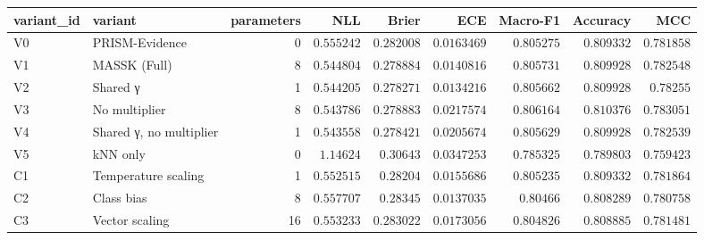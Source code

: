 \begin{tabular}{llrrrrrrr}
\toprule
variant\_id & variant & parameters & NLL & Brier & ECE & Macro-F1 & Accuracy & MCC \\
\midrule
V0 & PRISM-Evidence & 0 & $0.555242$ & $0.282008$ & $0.0163469$ & $0.805275$ & $0.809332$ & $0.781858$ \\
V1 & MASSK (Full) & 8 & $0.544804$ & $0.278884$ & $0.0140816$ & $0.805731$ & $0.809928$ & $0.782548$ \\
V2 & Shared γ & 1 & $0.544205$ & $0.278271$ & $0.0134216$ & $0.805662$ & $0.809928$ & $0.78255$ \\
V3 & No multiplier & 8 & $0.543786$ & $0.278883$ & $0.0217574$ & $0.806164$ & $0.810376$ & $0.783051$ \\
V4 & Shared γ, no multiplier & 1 & $0.543558$ & $0.278421$ & $0.0205674$ & $0.805629$ & $0.809928$ & $0.782539$ \\
V5 & kNN only & 0 & $1.14624$ & $0.30643$ & $0.0347253$ & $0.785325$ & $0.789803$ & $0.759423$ \\
C1 & Temperature scaling & 1 & $0.552515$ & $0.28204$ & $0.0155686$ & $0.805235$ & $0.809332$ & $0.781864$ \\
C2 & Class bias & 8 & $0.557707$ & $0.28345$ & $0.0137035$ & $0.80466$ & $0.808289$ & $0.780758$ \\
C3 & Vector scaling & 16 & $0.553233$ & $0.283022$ & $0.0173056$ & $0.804826$ & $0.808885$ & $0.781481$ \\
\bottomrule
\end{tabular}
